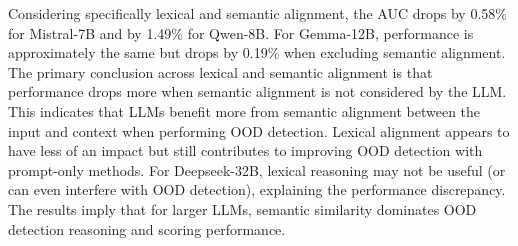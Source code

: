 Considering specifically lexical and semantic alignment, the AUC drops by 0.58\% for Mistral-7B and by 1.49\% for Qwen-8B. For Gemma-12B, performance is approximately the same but drops by 0.19\% when excluding semantic alignment. The primary conclusion across lexical and semantic alignment is that performance drops more when semantic alignment is not considered by the LLM. This indicates that LLMs benefit more from semantic alignment between the input and context when performing OOD detection. Lexical alignment appears to have less of an impact but still contributes to improving OOD detection with prompt-only methods. For Deepseek-32B, lexical reasoning may not be useful (or can even interfere with OOD detection), explaining the performance discrepancy. The results imply that for larger LLMs, semantic similarity dominates OOD detection reasoning and scoring performance.


